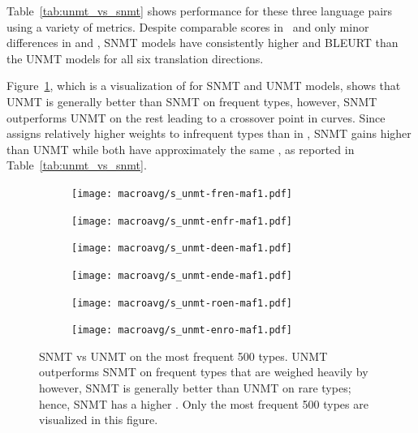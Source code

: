  Table~\ref{tab:unmt_vs_snmt} shows performance for these three language pairs using a variety of metrics. Despite comparable scores in \bleu\ and only minor differences in  and , SNMT models have consistently higher  and BLEURT than the UNMT models for all six translation directions. 
 
 
 Figure~\ref{fig:snmt_vs_unmt}, which is a visualization of  for SNMT and UNMT models,  shows that UNMT is generally better than SNMT on frequent types, however, SNMT outperforms UNMT on the rest leading to a crossover point in  curves. 
Since  assigns relatively higher weights to infrequent types than in \bleu{}, SNMT gains higher  than UNMT while both have approximately the same \bleu{}, as reported in Table~\ref{tab:unmt_vs_snmt}.

\begin{figure}[ht!]
    \centering
    \begin{subfigure}[b]{0.495\linewidth}
    \texttt{[image: macroavg/s\_unmt-fren-maf1.pdf]}
    \end{subfigure}
    \begin{subfigure}[b]{0.495\linewidth}
    \texttt{[image: macroavg/s\_unmt-enfr-maf1.pdf]}
    \end{subfigure}
    
    \begin{subfigure}[b]{0.495\linewidth}
    \texttt{[image: macroavg/s\_unmt-deen-maf1.pdf]}
    \end{subfigure}
    \begin{subfigure}[b]{0.495\linewidth}
    \texttt{[image: macroavg/s\_unmt-ende-maf1.pdf]}
    \end{subfigure}
    
    \begin{subfigure}[b]{0.495\linewidth}
    \texttt{[image: macroavg/s\_unmt-roen-maf1.pdf]}
    \end{subfigure}
    \begin{subfigure}[b]{0.495\linewidth}
      \texttt{[image: macroavg/s\_unmt-enro-maf1.pdf]}
    \end{subfigure}
     
\caption{SNMT vs UNMT  on the most frequent 500 types.
UNMT outperforms SNMT on frequent types that are weighed heavily by \bleu\, however, SNMT is generally better than UNMT on rare types; hence, SNMT has a higher .
Only the most frequent 500 types are visualized in this figure.
}
\label{fig:snmt_vs_unmt}
\end{figure} 



